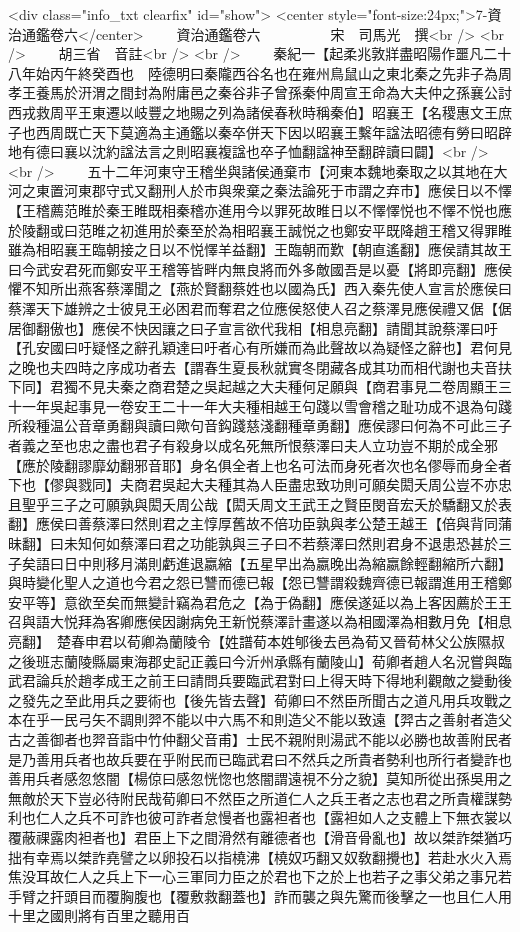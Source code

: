 <div class="info_txt clearfix" id="show">
<center style="font-size:24px;">7-資治通鑑卷六</center>
  　　資治通鑑卷六　　　　　宋　司馬光　撰<br />
<br />
　　胡三省　音註<br />
<br />
　　秦紀一【起柔兆敦牂盡昭陽作噩凡二十八年始丙午終癸酉也　陸德明曰秦隴西谷名也在雍州鳥鼠山之東北秦之先非子為周孝王養馬於汧渭之間封為附庸邑之秦谷非子曾孫秦仲周宣王命為大夫仲之孫襄公討西戎救周平王東遷以岐豐之地賜之列為諸侯春秋時稱秦伯】昭襄王【名稷惠文王庶子也西周既亡天下莫適為主通鑑以秦卒併天下因以昭襄王繫年諡法昭德有勞曰昭辟地有德曰襄以沈約諡法言之則昭襄複諡也卒子恤翻諡神至翻辟讀曰闢】<br />
<br />
　　五十二年河東守王稽坐與諸侯通棄市【河東本魏地秦取之以其地在大河之東置河東郡守式又翻刑人於市與衆棄之秦法論死于市謂之弃市】應侯日以不懌【王稽薦范睢於秦王睢既相秦稽亦進用今以罪死故睢日以不懌懌悦也不懌不悦也應於陵翻或曰范睢之初進用於秦至於為相昭襄王誠悦之也鄭安平既降趙王稽又得罪睢雖為相昭襄王臨朝接之日以不悦懌羊益翻】王臨朝而歎【朝直遙翻】應侯請其故王曰今武安君死而鄭安平王稽等皆畔内無良將而外多敵國吾是以憂【將即亮翻】應侯懼不知所出燕客蔡澤聞之【燕於賢翻蔡姓也以國為氏】西入秦先使人宣言於應侯曰蔡澤天下雄辨之士彼見王必困君而奪君之位應侯怒使人召之蔡澤見應侯禮又倨【倨居御翻傲也】應侯不快因讓之曰子宣言欲代我相【相息亮翻】請聞其說蔡澤曰吁【孔安國曰吁疑怪之辭孔穎達曰吁者心有所嫌而為此聲故以為疑怪之辭也】君何見之晚也夫四時之序成功者去【謂春生夏長秋就實冬閉藏各成其功而相代謝也夫音扶下同】君獨不見夫秦之商君楚之吳起越之大夫種何足願與【商君事見二卷周顯王三十一年吳起事見一卷安王二十一年大夫種相越王句踐以雪會稽之耻功成不退為句踐所殺種温公音章勇翻與讀曰歟句音鈎踐慈淺翻種章勇翻】應侯謬曰何為不可此三子者義之至也忠之盡也君子有殺身以成名死無所恨蔡澤曰夫人立功豈不期於成全邪【應於陵翻謬靡幼翻邪音耶】身名俱全者上也名可法而身死者次也名僇辱而身全者下也【僇與戮同】夫商君吳起大夫種其為人臣盡忠致功則可願矣閎夭周公豈不亦忠且聖乎三子之可願孰與閎夭周公哉【閎夭周文王武王之賢臣閔音宏夭於驕翻又於表翻】應侯曰善蔡澤曰然則君之主惇厚舊故不倍功臣孰與孝公楚王越王【倍與背同蒲昧翻】曰未知何如蔡澤曰君之功能孰與三子曰不若蔡澤曰然則君身不退患恐甚於三子矣語曰日中則移月滿則虧進退嬴縮【五星早出為嬴晚出為縮嬴餘輕翻縮所六翻】與時變化聖人之道也今君之怨已讐而德已報【怨已讐謂殺魏齊德已報謂進用王稽鄭安平等】意欲至矣而無變計竊為君危之【為于偽翻】應侯遂延以為上客因薦於王王召與語大悦拜為客卿應侯因謝病免王新悦蔡澤計畫遂以為相國澤為相數月免【相息亮翻】　楚春申君以荀卿為蘭陵令【姓譜荀本姓郇後去邑為荀又晉荀林父公族隰叔之後班志蘭陵縣屬東海郡史記正義曰今沂州承縣有蘭陵山】荀卿者趙人名況嘗與臨武君論兵於趙孝成王之前王曰請問兵要臨武君對曰上得天時下得地利觀敵之變動後之發先之至此用兵之要術也【後先皆去聲】荀卿曰不然臣所聞古之道凡用兵攻戰之本在乎一民弓矢不調則羿不能以中六馬不和則造父不能以致遠【羿古之善射者造父古之善御者也羿音詣中竹仲翻父音甫】士民不親附則湯武不能以必勝也故善附民者是乃善用兵者也故兵要在乎附民而已臨武君曰不然兵之所貴者勢利也所行者變詐也善用兵者感忽悠闇【楊倞曰感忽恍惚也悠闇謂遠視不分之貌】莫知所從出孫吳用之無敵於天下豈必待附民哉荀卿曰不然臣之所道仁人之兵王者之志也君之所貴權謀勢利也仁人之兵不可詐也彼可詐者怠慢者也露袒者也【露袒如人之支體上下無衣裳以覆蔽祼露肉袒者也】君臣上下之間滑然有離德者也【滑音骨亂也】故以桀詐桀猶巧拙有幸焉以桀詐堯譬之以卵投石以指橈沸【橈奴巧翻又奴敎翻攪也】若赴水火入焉焦没耳故仁人之兵上下一心三軍同力臣之於君也下之於上也若子之事父弟之事兄若手臂之扞頭目而覆胸腹也【覆敷救翻蓋也】詐而襲之與先驚而後擊之一也且仁人用十里之國則將有百里之聽用百
